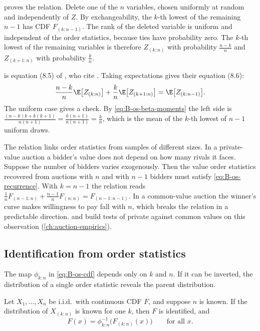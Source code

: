  proves the relation. Delete one of the $n$ variables, chosen uniformly at random and
independently of $Z$. By exchangeability, the $k$-th lowest of the remaining $n - 1$ has CDF $F_{(k:n-1)}$. The
rank of the deleted variable is uniform and independent of the order statistics, because ties have probability
zero. The $k$-th lowest of the remaining variables is therefore $Z_{(k:n)}$ with probability $\frac{n-k}{n}$ and
$Z_{(k+1:n)}$ with probability $\frac{k}{n}$.

 is equation (8.5) of \citet{AtheyHaile2007}, who cite \citet{David1981}. Taking
expectations gives their equation (8.6):
\begin{equation}\label{eq:B-os-recurrence-mean}
  \frac{n-k}{n}\E\big[Z_{(k:n)}\big] + \frac{k}{n}\E\big[Z_{(k+1:n)}\big] = \E\big[Z_{(k:n-1)}\big].
\end{equation}
The uniform case gives a check. By \eqref{eq:B-os-beta-moments} the left side is $\frac{(n-k)k +
k(k+1)}{n(n+1)} = \frac{k(n+1)}{n(n+1)} = \frac{k}{n}$, which is the mean of the $k$-th lowest of $n-1$
uniform draws.

The relation links order statistics from samples of different sizes. In a private-value auction a
bidder's value does not depend on how many rivals it faces. Suppose the number of bidders varies
exogenously. Then the value order statistics recovered from auctions with $n$ and with $n-1$ bidders must
satisfy \eqref{eq:B-os-recurrence}. With $k = n-1$ the relation reads $\frac{1}{n}F_{(n-1:n)} +
\frac{n-1}{n}F_{(n:n)} = F_{(n-1:n-1)}$. In a common-value auction the winner's curse makes willingness to pay
fall with $n$, which breaks the relation in a predictable direction. \citet{AtheyHaile2002} and
\citet[Section~8.3]{AtheyHaile2007} build tests of private against common values on this observation
(\cref{ch:auction-empirics}).

\subsection{Identification from order statistics}\label{sec:B-os-ident}

The map $\phi_{k:n}$ in \eqref{eq:B-os-cdf} depends only on $k$ and $n$. If it can be inverted, the
distribution of a single order statistic reveals the parent distribution.

\begin{proposition}\label{prop:B-os-identification}
Let $X_1, \dots, X_n$ be i.i.d.\ with continuous CDF $F$, and suppose $n$ is known. If the distribution of
$X_{(k:n)}$ is known for one $k$, then $F$ is identified, and
\begin{equation}\label{eq:B-os-inverse}
  F(x) = \phi_{k:n}^{-1}\big(F_{(k:n)}(x)\big) \qquad \text{for all } x.
\end{equation}
\end{proposition}

